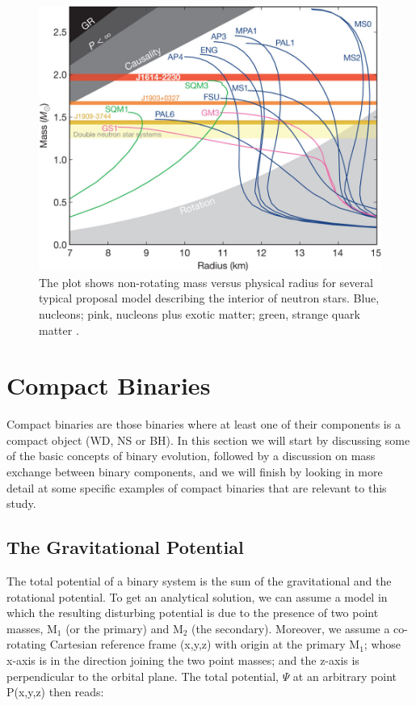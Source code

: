 \begin{figure}[]
        \centering
\includegraphics[scale=.3]{assets/images/es.jpg}
\caption{The plot shows non-rotating mass versus physical radius for several typical proposal model describing the interior of neutron stars. Blue, nucleons; pink, nucleons plus exotic matter; green, strange quark matter \citep{2010Natur.467.1081D}.}
\label{fig:nsmod}
\end{figure}


\section[Compact Binaries]{Compact Binaries}\label{sec:cb}

Compact binaries are those binaries where at least one of their components is a compact object (WD, NS or BH). In this section we will start by discussing some of the basic concepts of binary evolution, followed by a discussion on mass exchange between binary components,  and we will finish by looking in more detail at some specific examples of compact binaries that are relevant to this study.   


\subsection{The Gravitational Potential}

The total potential of a binary system is the sum of the gravitational and the rotational potential. To get an analytical solution, we can assume a model in which the resulting disturbing potential is due to the presence of two point masses, M$_1$ (or the primary) and M$_2$ (the secondary). Moreover, we assume a co-rotating Cartesian reference frame (x,y,z) with origin at the primary M$_1$; whose x-axis is in the direction joining the two point masses; and the z-axis is perpendicular to the orbital plane. The total potential, $\Psi$ at an arbitrary point P(x,y,z) then reads:

